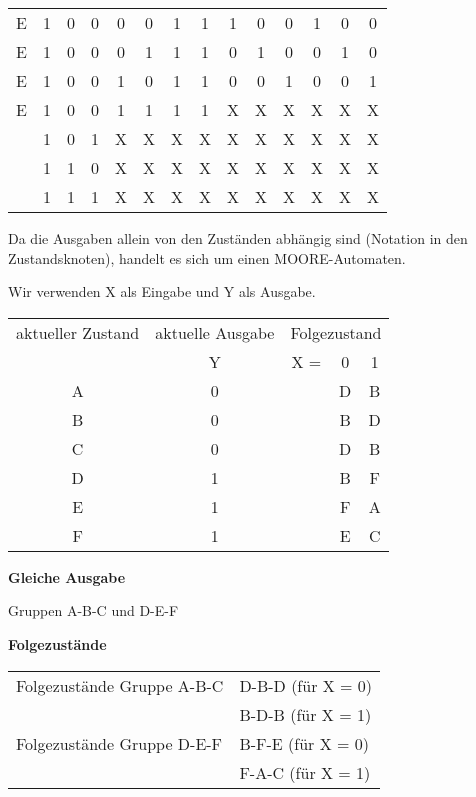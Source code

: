 \documentclass{CInf_practice}
\begin{document}
\begin{center}
\begin{tabular}{cccc|cc|cc|ccc>{\columncolor{lightgray!50}}c>{\columncolor{lightgray!50}}c>{\columncolor{lightgray!50}}c}
      E & 1 & 0 & 0 & 0 & 0 & 1 & 1 & 1 & 0 & 0 & 1 & 0 & 0 \\
      E & 1 & 0 & 0 & 0 & 1 & 1 & 1 & 0 & 1 & 0 & 0 & 1 & 0 \\
      E & 1 & 0 & 0 & 1 & 0 & 1 & 1 & 0 & 0 & 1 & 0 & 0 & 1 \\
      E & 1 & 0 & 0 & 1 & 1 & 1 & 1 & X & X & X & X & X & X \\\hline

        & 1 & 0 & 1 & X & X & X & X & X & X & X & X & X & X \\
        & 1 & 1 & 0 & X & X & X & X & X & X & X & X & X & X \\
        & 1 & 1 & 1 & X & X & X & X & X & X & X & X & X & X \\\hline
   \end{tabular}
\end{center}

Da die Ausgaben allein von den Zuständen abhängig sind (Notation in den Zustandsknoten), handelt es sich um einen MOORE-Automaten.

Wir verwenden X als Eingabe und Y als Ausgabe. 

\begin{tabular}{c|c|ccc}
\hline
aktueller Zustand & aktuelle Ausgabe & \multicolumn{3}{c}{Folgezustand} \\
                  & Y                & X = & 0 & 1 \\ \hline
               A  & 0                &     & D & B \\
               B  & 0                &     & B & D \\
               C  & 0                &     & D & B \\
               D  & 1                &     & B & F \\
               E  & 1                &     & F & A \\
               F  & 1                &     & E & C \\
\end{tabular}


\textbf{Gleiche Ausgabe}

Gruppen A-B-C und D-E-F

\bigskip\textbf{Folgezustände}

\begin{tabular}{ll}
Folgezustände Gruppe A-B-C & D-B-D (für X = 0) \\
                           & B-D-B (für X = 1) \\
Folgezustände Gruppe D-E-F & B-F-E (für X = 0) \\
                           & F-A-C (für X = 1) \\
\end{tabular}
\end{document}

